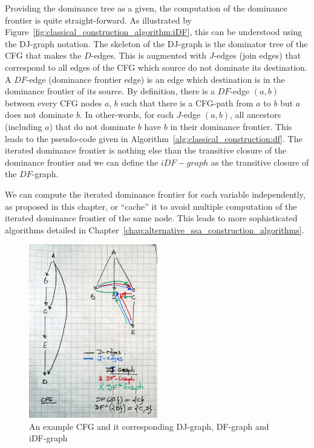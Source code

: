 Providing the dominance tree as a given, the computation of the dominance frontier is quite straight-forward. As illustrated by Figure~\ref{fig:classical_construction_algorithm:iDF}, this can be understood using the DJ-graph notation. The skeleton of the DJ-graph is the dominator tree of the CFG that makes the $D$-edges. This is augmented with $J$-edges (join edges) that correspond to all edges of the CFG which source do not dominate its destination. A $DF$-edge (dominance frontier edge) is an edge which destination is in the dominance frontier of its source. By definition, there is a $DF$-edge $(a,b)$ between every CFG nodes $a$, $b$ such that there is a CFG-path from $a$ to $b$ but $a$ does not dominate $b$. 
In other-words, for each  $J$-edge $(a,b)$, all ancestors (including $a$) that do not dominate $b$ have $b$ in their dominance frontier. This leads to the pseudo-code given in Algorithm~\ref{alg:classical_construction:df}. The iterated dominance frontier is nothing else than the transitive closure of the dominance frontier and we can define the $iDF-graph$ as the transitive closure of the $DF$-graph. 

We can compute the iterated dominance frontier for each variable independently, as proposed in this chapter, or ``cache'' it to avoid multiple computation of the iterated dominance frontier of the same node. This leads to more sophisticated algorithms detailed in Chapter~\ref{chap:alternative_ssa_construction_algorithms}.

\begin{figure}
\includegraphics[width=0.5\textwidth]{iDF.jpeg}
\caption{An example CFG and it corresponding DJ-graph, DF-graph and iDF-graph}
\end{figure}

